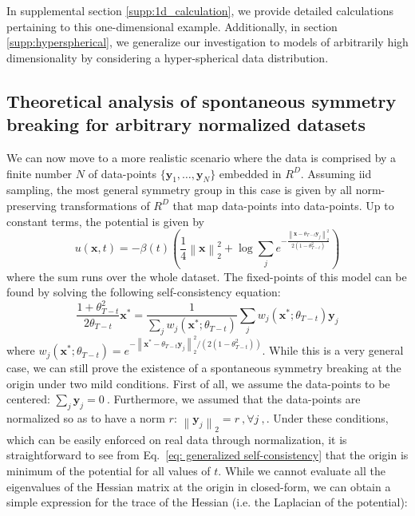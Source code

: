 \documentclass{article}
\newcommand{\vect}[1]{\boldsymbol{#1}}
\newcommand\norm[2]{{\left\lVert#1\right\rVert}_{#2}}
\begin{document}
In supplemental section \ref{supp:1d_calculation}, we provide detailed calculations pertaining to this one-dimensional example. Additionally, in section \ref{supp:hyperspherical}, we generalize our investigation to models of arbitrarily high dimensionality by considering a hyper-spherical data distribution.

\subsection{Theoretical analysis of spontaneous symmetry breaking for arbitrary normalized datasets}
\label{sec:normalized_datasets}
We can now move to a more realistic scenario where the data is comprised by a finite number $N$ of data-points $\{\vect{y}_1, \dots, \vect{y}_N\}$ embedded in $R^D$. Assuming iid sampling, the most general symmetry group in this case is given by all norm-preserving transformations of $R^D$ that map data-points into data-points. Up to constant terms, the potential is given by
\begin{equation}
    u(\vect{x}, t) = - \beta(t) \left(\frac{1}{4} \norm{\vect{x}}{2}^2 + \log{\sum_j e^{-\frac{\norm{\vect{x} - \theta_{T - t} \vect{y}_j}{2}^2}{2 ( 1 - \theta_{T-t}^2)}} } \right)
    \label{eq:potential_normalized_data}
\end{equation}
where the sum runs over the whole dataset. The fixed-points of this model can be found by solving the following self-consistency equation:
\begin{equation} \label{eq: generalized self-consistency}
    \frac{1 + \theta_{T - t}^2}{2 \theta_{T - t}} \vect{x}^* = \frac{1}{\sum_j w_j(\vect{x}^*; \theta_{T - t})} \sum_j w_j(\vect{x}^*; \theta_{T - t}) \vect{y}_j
\end{equation}
where $w_j(\vect{x}^*; \theta_{T - t}) = e^{-\norm{\vect{x}^* - \theta_{T - t} \vect{y}_j}{2}^2/(2(1 - \theta_{T - t}^2))}$. While this is a very general case, we can still prove the existence of a spontaneous symmetry breaking at the origin under two mild conditions. First of all, we assume the data-points to be centered:
$
\sum_j \vect{y}_j = 0~.
$
Furthermore, we assumed that the data-points are normalized so as to have a norm $r$:
$
    \norm{\vect{y}_j}{2} = r~, \forall j~,.
$
Under these conditions, which can be easily enforced on real data through normalization, it is straightforward to see from Eq.~\ref{eq: generalized self-consistency} that the origin is minimum of the potential for all values of $t$. While we cannot evaluate all the eigenvalues of the Hessian matrix at the origin in closed-form, we can obtain a simple expression for the trace of the Hessian (i.e. the Laplacian of the potential):
\end{document}
